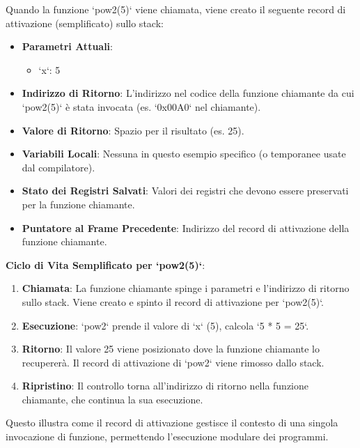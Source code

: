 Quando la funzione `pow2(5)` viene chiamata, viene creato il seguente record di attivazione (semplificato) sullo stack:

\begin{itemize}
    \item \textbf{Parametri Attuali}:
    \begin{itemize}
        \item `x`: 5
    \end{itemize}
    \item \textbf{Indirizzo di Ritorno}: L'indirizzo nel codice della funzione chiamante da cui `pow2(5)` è stata invocata (es. `0x00A0` nel chiamante).
    \item \textbf{Valore di Ritorno}: Spazio per il risultato (es. 25).
    \item \textbf{Variabili Locali}: Nessuna in questo esempio specifico (o temporanee usate dal compilatore).
    \item \textbf{Stato dei Registri Salvati}: Valori dei registri che devono essere preservati per la funzione chiamante.
    \item \textbf{Puntatore al Frame Precedente}: Indirizzo del record di attivazione della funzione chiamante.
\end{itemize}

\textbf{Ciclo di Vita Semplificato per `pow2(5)`}:
\begin{enumerate}
    \item \textbf{Chiamata}: La funzione chiamante spinge i parametri e l'indirizzo di ritorno sullo stack. Viene creato e spinto il record di attivazione per `pow2(5)`.
    \item \textbf{Esecuzione}: `pow2` prende il valore di `x` (5), calcola `5 * 5 = 25`.
    \item \textbf{Ritorno}: Il valore 25 viene posizionato dove la funzione chiamante lo recupererà. Il record di attivazione di `pow2` viene rimosso dallo stack.
    \item \textbf{Ripristino}: Il controllo torna all'indirizzo di ritorno nella funzione chiamante, che continua la sua esecuzione.
\end{enumerate}
Questo illustra come il record di attivazione gestisce il contesto di una singola invocazione di funzione, permettendo l'esecuzione modulare dei programmi.